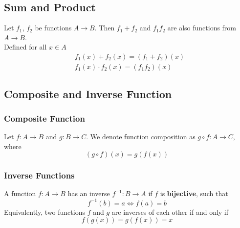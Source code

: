 \documentclass[11pt]{article}
\begin{document}
\subsection{Sum and Product}
Let $f_1$, $f_2$ be functions $A\to B$. Then $f_1 + f_2$ and $f_1f_2$ are also functions from $A \to B$.\\ Defined for all $x\in A$
\begin{align*}
    &f_1(x) + f_2(x) = (f_1 + f_2)(x)\\
    &f_1(x) \cdot f_2(x) = (f_1 f_2)(x)
\end{align*}
\subsection{Composite and Inverse Function}
\subsubsection{Composite Function}
Let $f: A\to B$ and $g: B \to C$. We denote function composition as $g \circ f: A\to C$, where 
\[
    (g\circ f)(x) = g(f(x))
\]
\begin{figure}[H]
    \centering
\end{figure}
\subsubsection{Inverse Functions}
A function $f: A \to B$ has an inverse $f^{-1}: B \to A$ if $f$ is \textbf{bijective}, such that
\[
    f^{-1}(b) = a \iff f(a) = b
\]
Equivalently, two functions $f$ and $g$ are inverses of each other if and only if
\[
    f(g(x)) = g(f(x)) = x
\]
\end{document}
